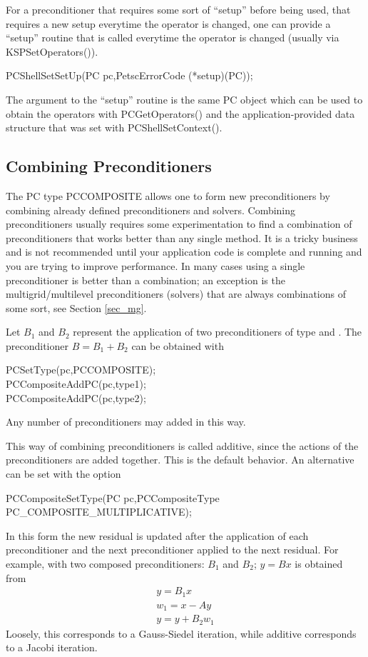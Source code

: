 For a preconditioner that requires some sort of ``setup'' before being used,
that requires a new setup everytime the operator is changed, one can 
provide a ``setup'' routine that is called everytime the operator is 
changed (usually via KSPSetOperators()).
\begin{tabbing}
  PCShellSetSetUp(PC pc,PetscErrorCode (*setup)(PC));
\end{tabbing}
The argument to the ``setup'' routine is the same PC object which
can be used to obtain the operators with PCGetOperators() and the
application-provided data structure that was set with PCShellSetContext().

\subsection{Combining Preconditioners} 

The PC type PCCOMPOSITE  allows one to form 
new preconditioners by combining already defined preconditioners and 
solvers. Combining preconditioners usually requires some experimentation
to find a combination of preconditioners that works better than any
single method. It is a tricky business and is not recommended until 
your application code is complete and running and you are trying to 
improve performance. In many cases using a single preconditioner is better
than a combination; an exception is the multigrid/multilevel preconditioners
(solvers) that are always combinations of some sort, see Section \ref{sec_mg}.

Let $B_1$ and $B_2$ represent the application of two 
preconditioners of type  and . The preconditioner
$ B = B_1 + B_2 $ can be obtained with
\begin{tabbing}
  PCSetType(pc,PCCOMPOSITE);\\
  PCCompositeAddPC(pc,type1);\\
  PCCompositeAddPC(pc,type2);
\end{tabbing}
Any number of preconditioners may added in this way. 

This way of combining preconditioners is called additive, since 
the actions of the preconditioners are added together. This is the 
default behavior. An alternative can be set with the option
\begin{tabbing}
  PCCompositeSetType(PC pc,PCCompositeType PC\_COMPOSITE\_MULTIPLICATIVE);
\end{tabbing}
 
In this form the new residual is updated after the application of 
each preconditioner and the next preconditioner applied to the next 
residual. For example, with two composed preconditioners: $B_1$ and 
$ B_2$; $ y = B x $ is obtained from
\begin{eqnarray*}
  y    = B_1 x \\
  w_1  = x - A y \\
  y    = y + B_2 w_1 
\end{eqnarray*}
Loosely, this corresponds to a Gauss-Siedel iteration, while
additive corresponds to a Jacobi iteration.

